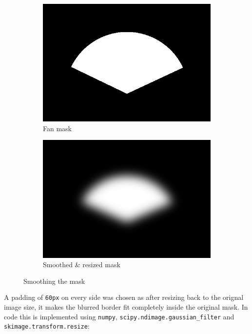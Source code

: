 \begin{figure}[H]
    \centering
    \begin{subfigure}[b]{.45\textwidth}
        \centering
        \includegraphics[width=\textwidth]{figures/pipeline/Mask.png}
        \caption{Fan mask}
    \end{subfigure}
    \hfill
    \begin{subfigure}[b]{.45\textwidth}
        \centering
        \includegraphics[width=\textwidth]{figures/pipeline/MaskBlurred.png}
        \caption{Smoothed \& resized mask}
    \end{subfigure}
    \caption{Smoothing the mask}
    \label{fig:mask-smoothing}
\end{figure}

A padding of \texttt{60px} on every side was chosen as after resizing back to the orignal image size, it makes the blurred border fit completely inside the original mask. In code this is implemented using \texttt{numpy}, \texttt{scipy.ndimage.gaussian\_filter} and \texttt{skimage.transform.resize}:

